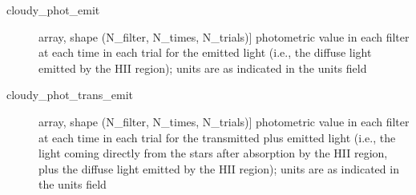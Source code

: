 \documentclass[letterpaper,10pt,english]{sphinxmanual}
\begin{document}
\begin{fulllineitems}
\begin{description}
\begin{description}
\item[{cloudy\_phot\_emit}] \leavevmode{[}array, shape (N\_filter, N\_times, N\_trials){]}
photometric value in each filter at each time in each trial for
the emitted light (i.e., the diffuse light emitted by the HII
region); units are as indicated in the units field

\item[{cloudy\_phot\_trans\_emit}] \leavevmode{[}array, shape (N\_filter, N\_times, N\_trials){]}
photometric value in each filter at each time in each trial for
the transmitted plus emitted light (i.e., the light coming
directly from the stars after absorption by the HII region,
plus the diffuse light emitted by the HII region); units are as
indicated in the units field

\end{description}

\end{description}

\end{fulllineitems}

\end{document}
